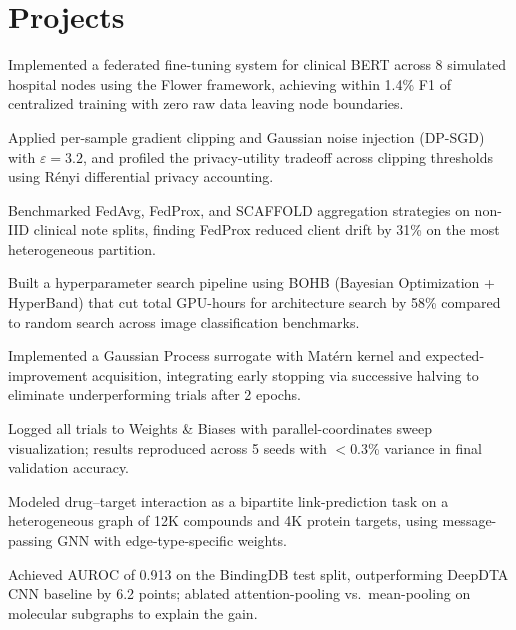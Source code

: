 \section{Projects}

\begin{rlist}
  \item Implemented a federated fine-tuning system for clinical BERT across 8 simulated hospital nodes using the Flower framework, achieving within 1.4\% F1 of centralized training with zero raw data leaving node boundaries.
  \item Applied per-sample gradient clipping and Gaussian noise injection (DP-SGD) with $\varepsilon = 3.2$, and profiled the privacy-utility tradeoff across clipping thresholds using R\'{e}nyi differential privacy accounting.
  \item Benchmarked FedAvg, FedProx, and SCAFFOLD aggregation strategies on non-IID clinical note splits, finding FedProx reduced client drift by 31\% on the most heterogeneous partition.
\end{rlist}

\begin{rlist}
  \item Built a hyperparameter search pipeline using BOHB (Bayesian Optimization + HyperBand) that cut total GPU-hours for architecture search by 58\% compared to random search across image classification benchmarks.
  \item Implemented a Gaussian Process surrogate with Mat\'{e}rn kernel and expected-improvement acquisition, integrating early stopping via successive halving to eliminate underperforming trials after 2 epochs.
  \item Logged all trials to Weights \& Biases with parallel-coordinates sweep visualization; results reproduced across 5 seeds with $<$0.3\% variance in final validation accuracy.
\end{rlist}

\begin{rlist}
  \item Modeled drug--target interaction as a bipartite link-prediction task on a heterogeneous graph of 12K compounds and 4K protein targets, using message-passing GNN with edge-type-specific weights.
  \item Achieved AUROC of 0.913 on the BindingDB test split, outperforming DeepDTA CNN baseline by 6.2 points; ablated attention-pooling vs.\ mean-pooling on molecular subgraphs to explain the gain.
\end{rlist}

